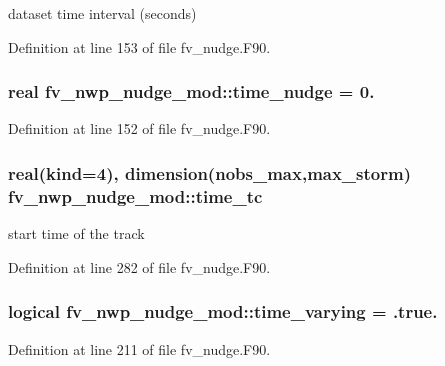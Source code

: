 dataset time interval (seconds) 



Definition at line 153 of file fv\-\_\-nudge.\-F90.

\subsubsection[{time\-\_\-nudge}]{\setlength{\rightskip}{0pt plus 5cm}real fv\-\_\-nwp\-\_\-nudge\-\_\-mod\-::time\-\_\-nudge = 0.\hspace{0.3cm}{\ttfamily [private]}}\label{classfv__nwp__nudge__mod_a2346c4b41d57e4f60a7029638bb5eef7}


Definition at line 152 of file fv\-\_\-nudge.\-F90.

\subsubsection[{time\-\_\-tc}]{\setlength{\rightskip}{0pt plus 5cm}real(kind=4), dimension({\bf nobs\-\_\-max},{\bf max\-\_\-storm}) fv\-\_\-nwp\-\_\-nudge\-\_\-mod\-::time\-\_\-tc\hspace{0.3cm}{\ttfamily [private]}}\label{classfv__nwp__nudge__mod_a943f847873f99de2546f21b2ec1a3a9e}


start time of the track 



Definition at line 282 of file fv\-\_\-nudge.\-F90.

\subsubsection[{time\-\_\-varying}]{\setlength{\rightskip}{0pt plus 5cm}logical fv\-\_\-nwp\-\_\-nudge\-\_\-mod\-::time\-\_\-varying = .true.\hspace{0.3cm}{\ttfamily [private]}}\label{classfv__nwp__nudge__mod_a798deef0b988b1711210e1bc67e44551}


Definition at line 211 of file fv\-\_\-nudge.\-F90.

